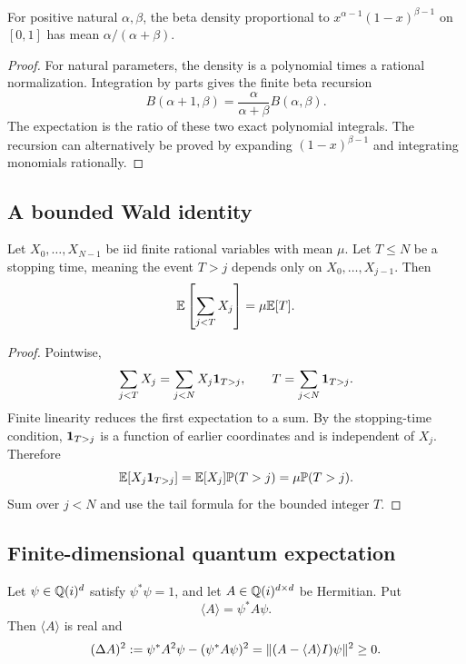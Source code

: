 \begin{proposition}\label{prop:beta}
For positive natural \(\alpha,\beta\), the beta density proportional to
\(x^{\alpha-1}(1-x)^{\beta-1}\) on \([0,1]\) has mean
\(\alpha/(\alpha+\beta)\).
\end{proposition}

\begin{proof}
For natural parameters, the density is a polynomial times a rational
normalization.  Integration by parts gives the finite beta recursion
\[
 B(\alpha+1,\beta)=\frac{\alpha}{\alpha+\beta}B(\alpha,\beta).
\]
The expectation is the ratio of these two exact polynomial integrals.  The
recursion can alternatively be proved by expanding
\((1-x)^{\beta-1}\) and integrating monomials rationally.
\end{proof}

\subsection{A bounded Wald identity}

\begin{theorem}
\label{thm:wald}
Let \(X_0,\ldots,X_{N-1}\) be iid finite rational variables with mean \(\mu\).
Let \(T\le N\) be a stopping time, meaning the event \(T>j\) depends only on
\(X_0,\ldots,X_{j-1}\).  Then
\[
 \mathbb E\left[\sum_{j<T}X_j\right]=\mu\mathbb E[T].
\]
\end{theorem}

\begin{proof}
Pointwise,
\[
 \sum_{j<T}X_j=\sum_{j<N}X_j\mathbf 1_{T>j},
 \qquad
 T=\sum_{j<N}\mathbf 1_{T>j}.
\]
Finite linearity reduces the first expectation to a sum.  By the stopping-time
condition, \(\mathbf 1_{T>j}\) is a function of earlier coordinates and is
independent of \(X_j\).  Therefore
\[
 \mathbb E[X_j\mathbf 1_{T>j}]=\mathbb E[X_j]\mathbb P(T>j)=\mu\mathbb P(T>j).
\]
Sum over \(j<N\) and use the tail formula for the bounded integer \(T\).
\end{proof}

\subsection{Finite-dimensional quantum expectation}

\begin{theorem}
\label{thm:quantum}
Let \(\psi\in\mathbb Q(i)^d\) satisfy \(\psi^*\psi=1\), and let
\(A\in\mathbb Q(i)^{d\times d}\) be Hermitian.  Put
\[
 \langle A\rangle=\psi^*A\psi.
\]
Then \(\langle A\rangle\) is real and
\[
 (\Delta A)^2
 \mathrel{:=}\psi^*A^2\psi-(\psi^*A\psi)^2
 =\lVert (A-\langle A\rangle I)\psi\rVert^2\ge0.
\]
\end{theorem}

